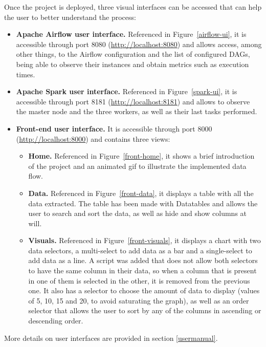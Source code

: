 \nonzeroparskip Once the project is deployed, three visual interfaces can be accessed that can help the user to better understand the process:
\begin{itemize}
	 \item \textbf{Apache Airflow user interface.} Referenced in Figure~\ref{airflow-ui}, it is accessible through port 8080 (\url{http://localhost:8080}) and allows access, among other things, to the Airflow configuration and the list of configured DAGs, being able to observe their instances and obtain metrics such as execution times.
	 \item \textbf{Apache Spark user interface.} Referenced in Figure~\ref{spark-ui}, it is accessible through port 8181 (\url{http://localhost:8181}) and allows to observe the master node and the three workers, as well as their last tasks performed.
	 \item \textbf{Front-end user interface.} It is accessible through port 8000 (\url{http://localhost:8000}) and contains three views:
	 \begin{itemize}
	 	\item \textbf{Home.} Referenced in Figure~\ref{front-home}, it shows a brief introduction of the project and an animated gif to illustrate the implemented data flow.
	 	\item \textbf{Data.} Referenced in Figure~\ref{front-data}, it displays a table with all the data extracted. The table has been made with Datatables and allows the user to search and sort the data, as well as hide and show columns at will.
	 	\item \textbf{Visuals.} Referenced in Figure~\ref{front-visuals}, it displays a chart with two data selectors, a multi-select to add data as a bar and a single-select to add data as a line. A script was added that does not allow both selectors to have the same column in their data, so when a column that is present in one of them is selected in the other, it is removed from the previous one. It also has a selector to choose the amount of data to display (values of 5, 10, 15 and 20, to avoid saturating the graph), as well as an order selector that allows the user to sort by any of the columns in ascending or descending order.
	 \end{itemize}
\end{itemize}

\nonzeroparskip More details on user interfaces are provided in section \ref{usermanual}.


